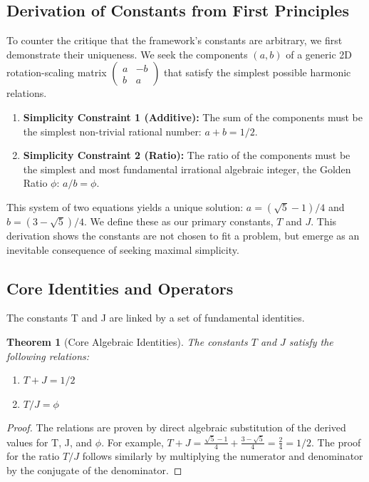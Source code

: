 \documentclass{amsart}
\theoremstyle{plain}
\newtheorem{theorem}{Theorem}
\theoremstyle{definition}
\theoremstyle{remark}
\begin{document}
\subsection{Derivation of Constants from First Principles}
To counter the critique that the framework's constants are arbitrary, we first demonstrate their uniqueness. We seek the components $(a,b)$ of a generic 2D rotation-scaling matrix $\left(\begin{smallmatrix} a & -b \\ b & a \end{smallmatrix}\right)$ that satisfy the simplest possible harmonic relations.
\begin{enumerate}
    \item \textbf{Simplicity Constraint 1 (Additive):} The sum of the components must be the simplest non-trivial rational number: $a+b = 1/2$.
    \item \textbf{Simplicity Constraint 2 (Ratio):} The ratio of the components must be the simplest and most fundamental irrational algebraic integer, the Golden Ratio $\phi$: $a/b = \phi$.
\end{enumerate}
This system of two equations yields a unique solution: $a = (\sqrt{5}-1)/4$ and $b = (3-\sqrt{5})/4$. We define these as our primary constants, $T$ and $J$. This derivation shows the constants are not chosen to fit a problem, but emerge as an inevitable consequence of seeking maximal simplicity.

\subsection{Core Identities and Operators}
The constants T and J are linked by a set of fundamental identities.
\begin{theorem}[Core Algebraic Identities]\label{thm:identities}
The constants $T$ and $J$ satisfy the following relations:
\begin{enumerate}
    \item $T+J = 1/2$
    \item $T/J = \phi$
\end{enumerate}
\end{theorem}
\begin{proof}
The relations are proven by direct algebraic substitution of the derived values for T, J, and $\phi$. For example, $T+J = \frac{\sqrt{5}-1}{4} + \frac{3-\sqrt{5}}{4} = \frac{2}{4} = 1/2$. The proof for the ratio $T/J$ follows similarly by multiplying the numerator and denominator by the conjugate of the denominator.
\end{proof}
\end{document}
